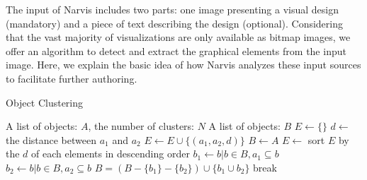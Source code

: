 The input of Narvis includes two parts: one image presenting a visual design (mandatory) and a piece of text describing the design (optional). Considering that the vast majority of visualizations are only available as bitmap images, we offer an algorithm to detect and extract the graphical elements from the input image. Here, we explain the basic idea of how Narvis analyzes these input sources to facilitate further authoring. 
%    
    
    \begin{algorithm}  
        \caption{Object Clustering} 
        \label{alg:alg2} 
        \begin{algorithmic} %
            \Require A list of objects: $A$, the number of clusters: $N$
            \Ensure A list of objects: $B$
            \State $E \gets \{\}$
                 
                        \State $d \gets$ the distance between $a_1$ and $a_2$
                        \State $E \gets E \cup \{(a_1, a_2, d)\}$
                    \EndIf
                \EndFor
            \EndFor
            \State $B \gets A$
            \State $E \gets$ sort $E$ by the $d$ of each elements in descending order
                \State $b_1 \gets b|b\in B, a_1 \subseteq b$
                \State $b_2 \gets b|b\in B, a_2 \subseteq b$
                    \State $B = (B - \{b_1\} - \{b_2\})\cup \{b_1 \cup b_2\}$
                \EndIf
                    \State break
                \EndIf
            \EndFor
            \State {}
        \end{algorithmic}  
    \end{algorithm} 
    
